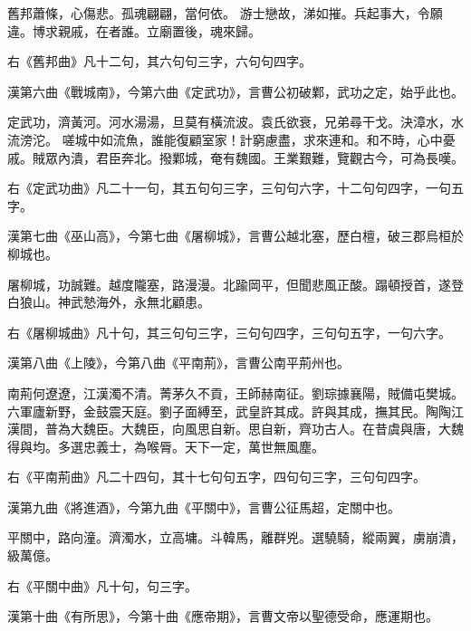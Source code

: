 \begin{pinyinscope}
 舊邦蕭條，心傷悲。孤魂翩翩，當何依。
 游士戀故，涕如摧。兵起事大，令願違。博求親戚，在者誰。立廟置後，魂來歸。



 右《舊邦曲》凡十二句，其六句句三字，六句句四字。



 漢第六曲《戰城南》，今第六曲《定武功》，言曹公初破鄴，武功之定，始乎此也。



 定武功，濟黃河。河水湯湯，旦莫有橫流波。袁氏欲衰，兄弟尋干戈。決漳水，水流滂沱。
 嗟城中如流魚，誰能復顧室家！計窮慮盡，求來連和。和不時，心中憂戚。賊眾內潰，君臣奔北。撥鄴城，奄有魏國。王業艱難，覽觀古今，可為長嘆。



 右《定武功曲》凡二十一句，其五句句三字，三句句六字，十二句句四字，一句五字。



 漢第七曲《巫山高》，今第七曲《屠柳城》，言曹公越北塞，歷白檀，破三郡烏桓於柳城也。



 屠柳城，功誠難。越度隴塞，路漫漫。北踰岡平，但聞悲風正酸。蹋頓授首，遂登白狼山。神武慹海外，永無北顧患。



 右《屠柳城曲》凡十句，其三句句三字，三句句四字，三句句五字，一句六字。



 漢第八曲《上陵》，今第八曲《平南荊》，言曹公南平荊州也。



 南荊何遼遼，江漢濁不清。菁茅久不貢，王師赫南征。劉琮據襄陽，賊備屯樊城。
 六軍廬新野，金鼓震天庭。劉子面縛至，武皇許其成。許與其成，撫其民。陶陶江漢間，普為大魏臣。大魏臣，向風思自新。思自新，齊功古人。在昔虞與唐，大魏得與均。多選忠義士，為喉脣。天下一定，萬世無風塵。



 右《平南荊曲》凡二十四句，其十七句句五字，四句句三字，三句句四字。



 漢第九曲《將進酒》，今第九曲《平關中》，言曹公征馬超，定關中也。



 平關中，路向潼。濟濁水，立高墉。斗韓馬，離群兇。選驍騎，縱兩翼，虜崩潰，級萬億。



 右《平關中曲》凡十句，句三字。



 漢第十曲《有所思》，今第十曲《應帝期》，言曹文帝以聖德受命，應運期也。




\end{pinyinscope}
